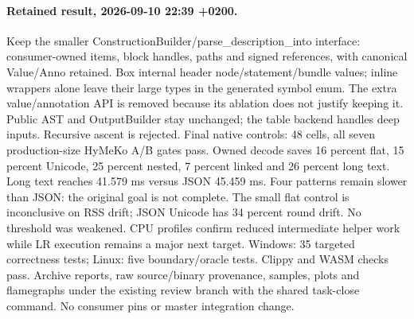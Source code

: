 \documentclass[11pt,a4paper]{article}
\begin{document}
\paragraph{Retained result, 2026-09-10 22:39 +0200.}
Keep the smaller ConstructionBuilder/parse\_description\_into interface: consumer-owned
items, block handles, paths and signed references, with canonical Value/Anno retained.
Box internal header node/statement/bundle values; inline wrappers alone leave their
large types in the generated symbol enum. The extra value/annotation API is removed
because its ablation does not justify keeping it. Public AST and OutputBuilder stay
unchanged; the table backend handles deep inputs. Recursive ascent is rejected.
Final native controls: 48 cells, all seven production-size HyMeKo A/B gates pass.
Owned decode saves 16 percent flat, 15 percent Unicode, 25 percent nested,
7 percent linked and 26 percent long text. Long text reaches 41.579 ms versus JSON
45.459 ms. Four patterns remain slower than JSON: the original goal is not complete.
The small flat control is inconclusive on RSS drift; JSON Unicode has 34 percent
round drift. No threshold was weakened. CPU profiles confirm reduced intermediate
helper work while LR execution remains a major next target. Windows: 35 targeted
correctness tests; Linux: five boundary/oracle tests. Clippy and WASM checks pass.
Archive reports, raw source/binary provenance, samples, plots and flamegraphs
under the existing review branch with the shared task-close command. No consumer
pins or master integration change.
\end{document}
